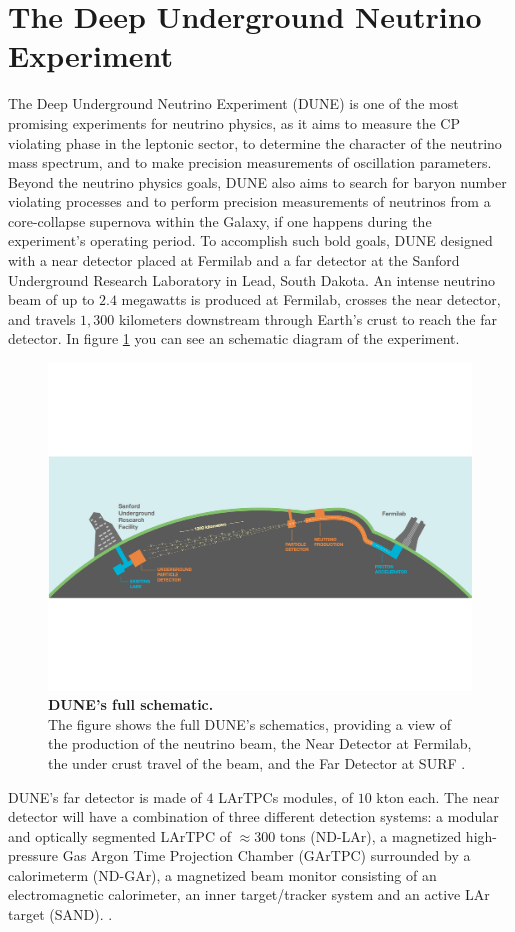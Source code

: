 \section{The Deep Underground Neutrino Experiment}
%
The Deep Underground Neutrino Experiment (DUNE) is one of the most promising experiments for neutrino physics, as it aims to measure the CP violating phase in the leptonic sector, to determine the character of the neutrino mass spectrum, and to make precision measurements of oscillation parameters. Beyond the neutrino physics goals, DUNE also aims to search for baryon number violating processes and to perform precision measurements of neutrinos from a core-collapse supernova within the Galaxy, if one happens during the experiment's operating period. 
To accomplish such bold goals, DUNE designed with a near detector placed at Fermilab and a far detector at the Sanford Underground Research Laboratory in Lead, South Dakota. An intense neutrino beam of up to $2.4$ megawatts is produced at Fermilab, crosses the near detector, and travels $1,300$ kilometers downstream through Earth's crust to reach the far detector. In figure \ref{DUNE_full_schematic} you can see an schematic diagram of the experiment. 
%
\begin{figure}[h!]
	\begin{center}
		\includegraphics[scale=0.6]{Figures/DUNE_full_schematic.pdf}
		\caption[DUNE's full schematic]{ {\textbf{DUNE's full schematic.}} \\The figure shows the full DUNE's schematics, providing a view of the production of the neutrino beam, the Near Detector at Fermilab, the under crust travel of the beam, and the Far Detector at SURF \cite{dune_snowmass_22}.}
		\label{DUNE_full_schematic}	
	\end{center}
\end{figure}
%
DUNE's far detector is made of $4$ LArTPCs modules, of $10$ kton each. The near detector will have a combination of three different detection systems: a modular and optically segmented LArTPC of $\approx300$ tons (ND-LAr), a magnetized high-pressure Gas Argon Time Projection Chamber (GArTPC) surrounded by a calorimeterm (ND-GAr), a magnetized beam monitor consisting of an electromagnetic calorimeter, an inner target/tracker system and an active LAr target (SAND). \cite{dune_snowmass_22, dune_SAND}.